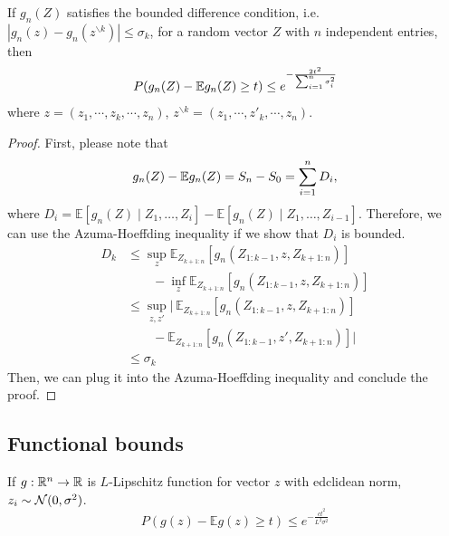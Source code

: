\begin{theorem}
If $g_n(Z)$ satisfies the bounded difference condition, i.e. $|g_n(z) - g_n(z^{\backslash k})| \leq \sigma_k$,  for a random vector $Z$ with $n$ independent entries, then
\begin{align*}
    P(g_n(Z) - \mathbb{E} g_n(Z) \geq t) \leq e^{-\frac{2t^2}{\sum_{i=1}^n \sigma^2_i}}
\end{align*}
where $z = (z_1, \cdots, z_k, \cdots, z_n)$, $z^{\backslash k} = (z_1, \cdots, z'_k, \cdots, z_n)$.
\end{theorem}
\begin{proof}
First, please note that
$$ g_n(Z) - \mathbb{E} g_n(Z) = S_n - S_0 = \sum_{i=1}^n D_i,
$$
where $D_i = \mathbb{E}\left[g_{n}(Z) \mid Z_{1}, \ldots, Z_{i}\right]-\mathbb{E}\left[g_{n}(Z) \mid Z_{1}, \ldots, Z_{i-1}\right]$.
Therefore, we can use the Azuma-Hoeffding inequality if we show that $D_i$ is bounded.
\begin{align*}
    D_k & \leq  \sup _{z} \mathbb{E}_{Z_{k+1:n}}\left[g_n\left(Z_{1:k-1}, z, Z_{k+1:n}\right)\right] \\
        & \qquad  -\inf_{z} \mathbb{E}_{Z_{k+1:n}}\left[g_n\left(Z_{1:k-1}, z, Z_{k+1:n}\right)\right] \\
    & \leq \sup _{z, z'} \bigg|\, \mathbb{E}_{Z_{k+1:n}}\left[g_n\left(Z_{1:k-1}, z, Z_{k+1:n}\right)\right]  \\
    & \qquad - \mathbb{E}_{Z_{k+1:n}}\left[g_n\left(Z_{1:k-1}, z',  Z_{k+1:n}\right)\right] \bigg| \\
    & \leq \sigma_k
\end{align*}
Then, we can plug it into the Azuma-Hoeffding inequality and conclude the proof.
\end{proof}

\subsection{Functional bounds}
\begin{theorem}
If $g: \mathbb{R}^n \rightarrow \mathbb{R}$ is $L$-Lipschitz function for vector $z$ with edclidean norm, $z_i \sim \mathcal{N}(0, \sigma^2)$. 
$$
P(g(z)-\mathbb{E} g(z) \geq t) \leq e^{-\frac{c t^{2}}{L^{2} \sigma^{2}}}
$$
\end{theorem}